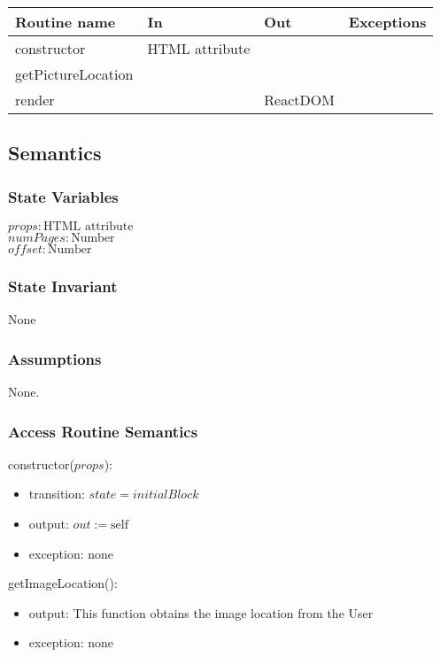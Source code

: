\documentclass[12pt, titlepage]{article}
\begin{document}
\begin{tabular}{| l | l | l | l |}
  \hline
  \textbf{Routine name} & \textbf{In} & \textbf{Out} & \textbf{Exceptions}\\
  \hline
  constructor & HTML attribute & ~ & ~\\
  \hline
  getPictureLocation & ~ & ~ & ~\\
  \hline
  render & ~ & ReactDOM & ~\\
  \hline
\end{tabular}

\subsection{Semantics}

\subsubsection{State Variables}

$\mathit{props}: \text{HTML attribute}$\\
$\mathit{numPages}: \text{Number}$\\
$\mathit{offset}: \text{Number}$

\subsubsection{State Invariant}

None

\subsubsection{Assumptions}

None.

\subsubsection{Access Routine Semantics}

\noindent constructor($props$):
\begin{itemize}
\item transition: $\mathit{state} = initialBlock$
\item output: $out := \mbox{self}$
\item exception: none
\end{itemize}

\noindent getImageLocation():
\begin{itemize}
\item output: This function obtains the image location from the User
\item exception: none
\end{itemize}
\end{document}
